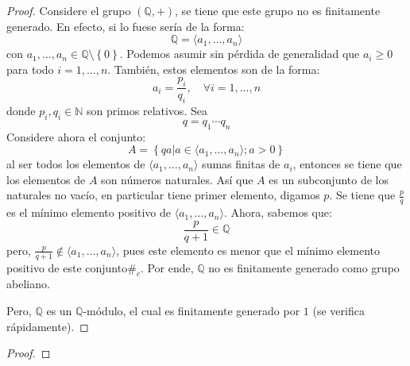 \documentclass[12pt]{report}
\newcounter{it}
\theoremstyle{largebreak}
\newcommand\contradiction{\ensuremath{\#_c}}
\begin{document}
    \begin{proof}
        Considere el grupo $(\mathbb{Q},+)$, se tiene que este grupo no es finitamente generado. En efecto, si lo fuese sería de la forma:
        \begin{equation*}
            \mathbb{Q}=\langle a_1,\dots,a_n \rangle
        \end{equation*}
        con $a_1,...,a_n\in\mathbb{Q}\setminus\left\{0\right\}$. Podemos asumir sin pérdida de generalidad que $a_i\geq 0$ para todo $i=1,...,n$. También, estos elementos son de la forma:
        \begin{equation*}
            a_i=\frac{p_i}{q_i},\quad\forall i=1,...,n
        \end{equation*}
        donde $p_i,q_i\in\mathbb{N}$ son primos relativos. Sea
        \begin{equation*}
            q=q_1\cdots q_n
        \end{equation*}
        Considere ahora el conjunto:
        \begin{equation*}
            A=\left\{qa\Big|a\in\langle a_1,\dots,a_n \rangle;a>0 \right\}
        \end{equation*}
        al ser todos los elementos de $\langle a_1,\dots,a_n \rangle$ sumas finitas de $a_i$, entonces se tiene que los elementos de $A$ son números naturales. Así que $A$ es un subconjunto de los naturales no vacío, en particular tiene primer elemento, digamos $p$. Se tiene que $\frac{p}{q}$ es el mínimo elemento positivo de $\langle a_1,\dots,a_n \rangle$. Ahora, sabemos que:
        \begin{equation*}
            \frac{p}{q+1}\in\mathbb{Q}
        \end{equation*}
        pero, $\frac{p}{q+1}\notin\langle a_1,\dots,a_n \rangle$, pues este elemento es menor que el mínimo elemento positivo de este conjunto\contradiction. Por ende, $\mathbb{Q}$ no es finitamente generado como grupo abeliano.

        Pero, $\mathbb{Q}$ es un $\mathbb{Q}$-módulo, el cual es finitamente generado por $1$ (se verifica rápidamente).
    \end{proof}

    \begin{excer}
        
    \end{excer}

    \begin{proof}
        
    \end{proof}
\end{document}
